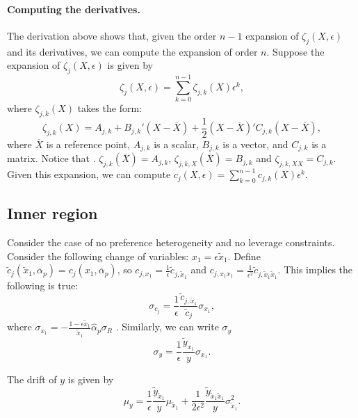 \paragraph{Computing the derivatives.} The derivation above shows that, given the order $n-1$ expansion of $\zeta_j(X,\epsilon)$ and its derivatives, we can compute the expansion of order $n$. Suppose the expansion of $\zeta_{j}(X,\epsilon)$ is given by
\begin{equation}
    \zeta_j(X,\epsilon) = \sum_{k=0}^{n-1} \zeta_{j,k}(X) \epsilon^k,
\end{equation}
where $\zeta_{j,k}(X)$ takes the form:
\begin{equation}
    \zeta_{j,k}(X) = A_{j,k} + B_{j,k}' (X-\overline{X}) + \frac{1}{2} (X- \overline{X})' C_{j,k} (X - \overline{X}),
\end{equation}
where $\overline{X}$ is a reference point, $A_{j,k}$ is a scalar, $B_{j,k}$ is a vector, and $C_{j,k}$ is a matrix. Notice that . $\zeta_{j,k}(\overline{X}) = A_{j,k}$, $\zeta_{j,k,X}(\overline{X}) = B_{j,k}$ and $\zeta_{j,k,XX} = C_{j,k}$. Given this expansion, we can compute $c_j(X,\epsilon) = \sum_{k=0}^{n-1} c_{j,k}(X) \epsilon^k$.

\subsection{Inner region}

Consider the case of no preference heterogeneity and no leverage constraints. Consider the following change of variables: $x_1 = \epsilon \tilde{x}_1$. Define $\tilde{c}_j( \tilde{x}_1, \overline{\alpha}_p ) = c_j\left(x_1, \overline{\alpha}_p\right) $, so $c_{j,x_1}= \frac{1}{\epsilon} \tilde{c}_{j,\tilde{x}_1}  $ and $ c_{j,x_1 x_1}= \frac{1}{\epsilon^2} \tilde{c}_{j,\tilde{x}_1 \tilde{x}_1}$. This implies the following is true:
\begin{equation}
    \sigma_{c_j} =  \frac{1}{\epsilon}\frac{\tilde{c}_{j,\tilde{x}_1}}{\tilde{c}_j} \sigma_{x_1},
\end{equation}
where $\sigma_{x_1} = - \frac{1-\epsilon \tilde{x}_1}{\tilde{x}_1} \hat{\alpha}_p \sigma_R$ . Similarly, we can write $\sigma_{y}$
\begin{equation}
    \sigma_y = \frac{1}{\epsilon} \frac{\tilde{y}_{x_1}}{y} \sigma_{x_1}.
\end{equation}

The drift of $y$ is given by
\begin{equation}
    \mu_{y} = \frac{1}{\epsilon} \frac{\tilde{y}_{\tilde{x}_1}}{y} \mu_{\tilde{x}_1} + \frac{1}{2 \epsilon^2}  \frac{\tilde{y}_{\tilde{x}_1 \tilde{x}_1}}{y} \sigma_{\tilde{x}_1}^2.
\end{equation}

